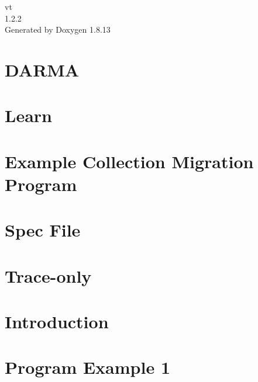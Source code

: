 \documentclass[twoside]{book}
\newcommand{\+}{\discretionary{\mbox{\scriptsize$\hookleftarrow$}}{}{}}
\newcommand{\clearemptydoublepage}{%
  \newpage{\pagestyle{empty}\cleardoublepage}%
}
\begin{document}
\hypersetup{pageanchor=false,
             bookmarksnumbered=true,
             pdfencoding=unicode
            }
\begin{titlepage}
\vspace*{7cm}
\begin{center}%
{\Large vt \\[1ex]\large 1.\+2.\+2 }\\
\vspace*{1cm}
{\large Generated by Doxygen 1.8.13}\\
\end{center}
\end{titlepage}
\clearemptydoublepage
{}
\tableofcontents
\clearemptydoublepage
{}
\hypersetup{pageanchor=true}

\chapter{D\+A\+R\+MA}
\label{index}\hypertarget{index}{}
\chapter{Learn}
\label{learn}

\chapter{Example Collection Migration Program}
\label{migrate-collection-example}

\chapter{Spec File}
\label{spec-file}

\chapter{Trace-\/only}
\label{trace-only}

\chapter{Introduction}
\label{introduction}

\chapter{Program Example 1}
\label{ckpt_learn_ex1}

\end{document}
